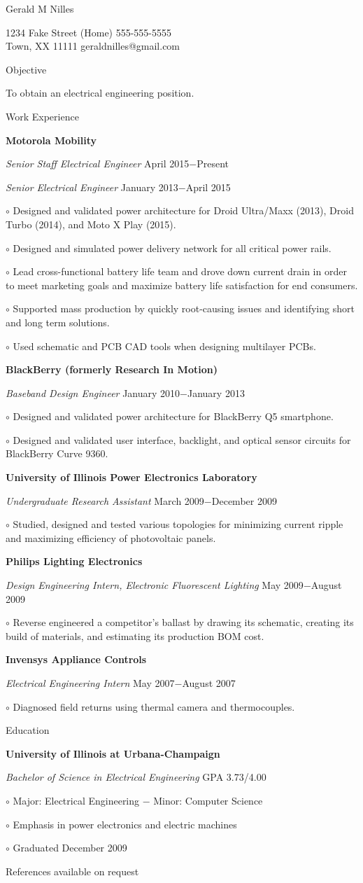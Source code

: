 \documentclass[12pt, letterpaper]{article}
\newcommand{\myname}[1]{{\begin{center} \LARGE #1 \end{center} \par }}
\newcommand{\myhead}[1]{{\vspace{2mm} \Large #1 \par}}
\newcommand{\objective}[1]{{\addtolength{\leftskip}{10mm} #1 \par }}
\newcommand{\company}[1]{{\vspace{1mm} \addtolength{\leftskip}{10mm} \textbf{#1} \par}}
\newcommand{\position}[2]{{\addtolength{\leftskip}{10mm} \emph{#1} \hfill #2 \par \vspace{1mm}}}
\newcommand{\skill}[1]{{  \vspace{0.3mm} \addtolength{\leftskip}{20mm} \setlength\parindent{-4mm} $\circ$ #1 \par}}
\begin{document}
\pagestyle{empty}
\raggedright

\myname{Gerald M Nilles}
1234 Fake Street  \hfill (Home) 555-555-5555 \\
Town, XX 11111   \hfill geraldnilles@gmail.com \\
\myhead{Objective}
    \objective{To obtain an electrical engineering position.}

\myhead{Work Experience}
    \company{Motorola Mobility}
    \position{Senior Staff Electrical Engineer}{April 2015$-$Present}
    \position{Senior Electrical Engineer}{January 2013$-$April 2015}
        \skill{Designed and validated power architecture for Droid Ultra/Maxx (2013), Droid Turbo (2014), and Moto X Play (2015).}
        \skill{Designed and simulated power delivery network for all critical power rails.}
        \skill{Lead cross-functional battery life team and drove down current drain in order to meet marketing goals and maximize battery life satisfaction for end consumers.}
	\skill{Supported mass production by quickly root-causing issues and identifying short and long term solutions.}
        \skill{Used schematic and PCB CAD tools when designing multilayer PCBs.}

    \company{BlackBerry (formerly Research In Motion)}
    \position{Baseband Design Engineer}{January 2010$-$January 2013}
        \skill{Designed and validated power architecture for BlackBerry Q5 smartphone.}
        \skill{Designed and validated user interface, backlight, and optical sensor circuits for BlackBerry Curve 9360.}

    \company{University of Illinois Power Electronics Laboratory}
    \position{Undergraduate Research Assistant}{March 2009$-$December 2009}
        \skill{Studied, designed and tested various topologies for minimizing current ripple and maximizing efficiency of photovoltaic panels.}

    \company{Philips Lighting Electronics} 
    \position{Design Engineering Intern, Electronic Fluorescent Lighting}{May 2009$-$August 2009}
        \skill{Reverse engineered a competitor's ballast by drawing its schematic, creating its build of materials, and estimating its production BOM cost.}

    \company{Invensys Appliance Controls}
    \position{Electrical Engineering Intern}{May 2007$-$August 2007}
        \skill{Diagnosed field returns using thermal camera and thermocouples.}

\myhead{Education}
    \company{University of Illinois at Urbana-Champaign}
    \position{Bachelor of Science in Electrical Engineering}{GPA 3.73/4.00}
        \skill{Major: Electrical Engineering $-$ Minor: Computer Science}
        \skill{Emphasis in power electronics and electric machines}
        \skill{Graduated December 2009}

\begin{center}
\small
References available on request
\end{center}
\end{document}
